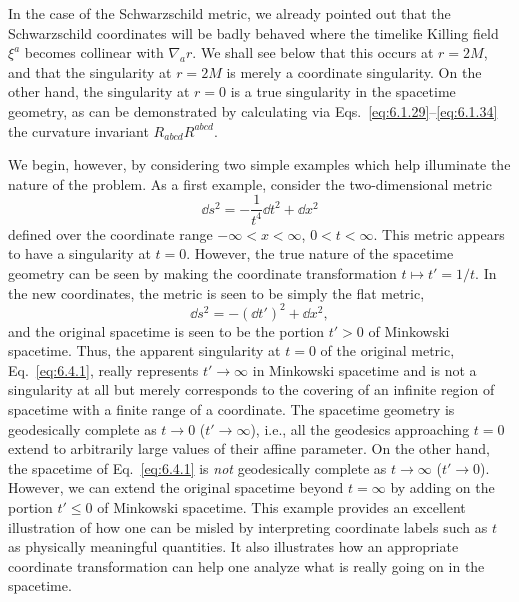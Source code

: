 In the case of the Schwarzschild metric, we already pointed out that the
Schwarzschild coordinates will be badly behaved where the timelike Killing field
\(\xi^a\) becomes collinear with \(\nabla_a r\). We shall see below that this
occurs at \(r=2M\), and that the singularity at \(r=2M\) is merely a coordinate
singularity. On the other hand, the singularity at \(r=0\) is a true singularity
in the spacetime geometry, as can be demonstrated by calculating via
Eqs.~\eqref{eq:6.1.29}--\eqref{eq:6.1.34} the curvature invariant
\(R_{abcd}R^{abcd}\).

We begin, however, by considering two simple examples which help illuminate the
nature of the problem. As a first example, consider the two-dimensional metric
\begin{equation}
  \dd s^2=-\frac{1}{t^4}\dd t^2+\dd x^2
  \tag{6.4.1}\label{eq:6.4.1}
\end{equation}
defined over the coordinate range \(-\infty<x<\infty\), \(0<t<\infty\). This
metric appears to have a singularity at \(t=0\). However, the true nature of the
spacetime geometry can be seen by making the coordinate transformation
\(t\mapsto t'=1/t\). In the new coordinates, the metric is seen to be simply the
flat metric,
\begin{equation}
  \dd s^2=-(\dd t')^2+\dd x^2,
  \tag{6.4.2}\label{eq:6.4.2}
\end{equation}
and the original spacetime is seen to be the portion \(t'>0\) of Minkowski
spacetime. Thus, the apparent singularity at \(t=0\) of the original metric,
Eq.~\eqref{eq:6.4.1}, really represents \(t'\to\infty\) in Minkowski spacetime
and is not a singularity at all but merely corresponds to the covering of an
infinite region of spacetime with a finite range of a coordinate. The spacetime
geometry is geodesically complete as \(t\to0\) (\(t'\to\infty\)), i.e., all the
geodesics approaching \(t=0\) extend to arbitrarily large values of their affine
parameter. On the other hand, the spacetime of Eq.~\eqref{eq:6.4.1} is \emph{not}
geodesically complete as \(t\to\infty\) (\(t'\to0\)). However, we can extend the
original spacetime beyond \(t=\infty\) by adding on the portion \(t'\leq0\) of
Minkowski spacetime. This example provides an excellent illustration of how one
can be misled by interpreting coordinate labels such as \(t\) as physically
meaningful quantities. It also illustrates how an appropriate coordinate
transformation can help one analyze what is really going on in the spacetime.

